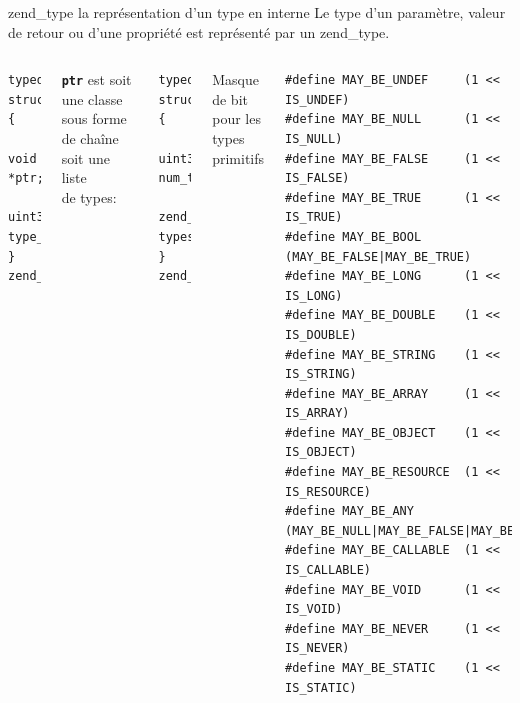 \documentclass[10pt]{beamer}
\begin{document}
\begin{frame}[fragile]{zend\_type la représentation d'un type en interne}
    Le type d'un paramètre, valeur de retour ou d'une propriété est représenté par un \alert{zend\_type}.
    \begin{columns}[T,onlytextwidth]
            \begin{verbatim}
typedef struct {
  void *ptr;
  uint32_t type_mask;
} zend_type;
            \end{verbatim}
            \texttt{\textbf{ptr}} est soit une classe sous forme de chaîne
            soit une liste \\de types:
            \begin{verbatim}
typedef struct {
  uint32_t num_types;
  zend_type types[1];
} zend_type_list;
            \end{verbatim}
    
            Masque de bit pour les types primitifs
            \begin{verbatim}
#define MAY_BE_UNDEF     (1 << IS_UNDEF)
#define MAY_BE_NULL      (1 << IS_NULL)
#define MAY_BE_FALSE     (1 << IS_FALSE)
#define MAY_BE_TRUE      (1 << IS_TRUE)
#define MAY_BE_BOOL      (MAY_BE_FALSE|MAY_BE_TRUE)
#define MAY_BE_LONG      (1 << IS_LONG)
#define MAY_BE_DOUBLE    (1 << IS_DOUBLE)
#define MAY_BE_STRING    (1 << IS_STRING)
#define MAY_BE_ARRAY     (1 << IS_ARRAY)
#define MAY_BE_OBJECT    (1 << IS_OBJECT)
#define MAY_BE_RESOURCE  (1 << IS_RESOURCE)
#define MAY_BE_ANY       (MAY_BE_NULL|MAY_BE_FALSE|MAY_BE_TRUE|MAY_BE_LONG|MAY_BE_DOUBLE|MAY_BE_STRING|MAY_BE_ARRAY|MAY_BE_OBJECT|MAY_BE_RESOURCE)
#define MAY_BE_CALLABLE  (1 << IS_CALLABLE)
#define MAY_BE_VOID      (1 << IS_VOID)
#define MAY_BE_NEVER     (1 << IS_NEVER)
#define MAY_BE_STATIC    (1 << IS_STATIC)
            \end{verbatim}
    \end{columns}
\end{frame}
\end{document}
